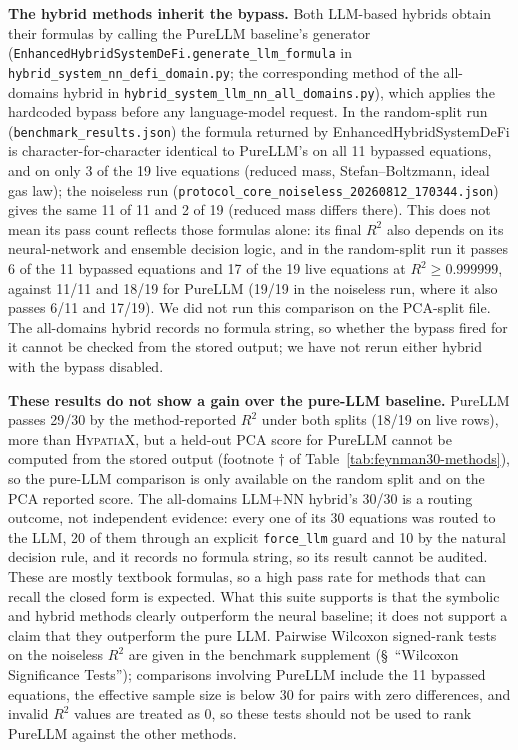 \documentclass[twoside,11pt]{article}
\newcommand{\Rsq}{R^{2}}
\begin{document}
\textbf{The hybrid methods inherit the bypass.} Both LLM-based hybrids obtain their formulas by calling the
PureLLM baseline's generator (\texttt{EnhancedHybridSystemDeFi.generate\_llm\_formula} in
\texttt{hybrid\_system\_nn\_defi\_domain.py}; the corresponding method of the all-domains hybrid in
\texttt{hybrid\_system\_llm\_nn\_all\_domains.py}), which applies the hardcoded bypass before any language-model request.
In the random-split run (\texttt{benchmark\_results.json}) the formula returned by
EnhancedHybridSystemDeFi is character-for-character identical to PureLLM's on all 11 bypassed equations, and on only 3 of the
19 live equations (reduced mass, Stefan--Boltzmann, ideal gas law); the noiseless run
(\texttt{protocol\_core\_noiseless\_20260812\_170344.json}) gives the same 11 of 11 and 2 of 19 (reduced mass differs there).
This does not mean its pass count reflects those formulas alone: its final $\Rsq$ also depends on its
neural-network and ensemble decision logic, and in the random-split run it passes 6 of the 11 bypassed equations and 17 of the 19 live
equations at $\Rsq \geq 0.999999$, against 11/11 and 18/19 for PureLLM (19/19 in the noiseless run, where it also passes 6/11 and 17/19).
We did not run this comparison on the PCA-split file. The all-domains hybrid records no formula string, so
whether the bypass fired for it cannot be checked from the stored output; we have not rerun either hybrid with the bypass disabled.

\textbf{These results do not show a gain over the pure-LLM baseline.}
PureLLM passes 29/30 by the method-reported $\Rsq$ under both splits (18/19 on live rows), more than \textsc{HypatiaX},
but a held-out PCA score for PureLLM cannot be computed from the stored output (footnote $\dagger$ of
Table~\ref{tab:feynman30-methods}), so the pure-LLM comparison is only available on the random split
and on the PCA reported score. The all-domains LLM+NN hybrid's 30/30 is a routing outcome, not independent
evidence: every one of its 30 equations was routed to the LLM, 20 of them through an explicit
\texttt{force\_llm} guard and 10 by the natural decision rule, and it records no formula string, so its
result cannot be audited. These are mostly textbook formulas, so a high pass rate for methods that can recall the
closed form is expected. What this suite supports is that the symbolic and hybrid methods clearly outperform
the neural baseline; it does not support a claim that they outperform the pure LLM. Pairwise Wilcoxon signed-rank tests on the noiseless
$\Rsq$ are given in the benchmark supplement (\S~``Wilcoxon Significance Tests''); comparisons involving PureLLM include
the 11 bypassed equations, the effective sample size is below 30 for pairs with zero differences, and invalid $\Rsq$ values
are treated as 0, so these tests should not be used to rank PureLLM against the other methods.
\end{document}
